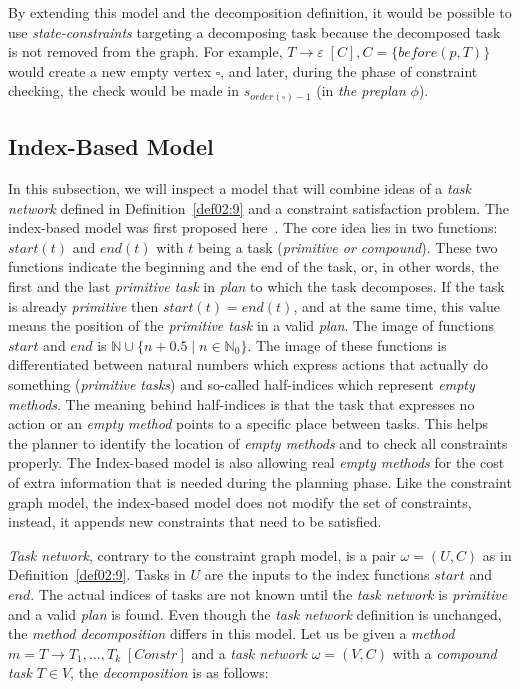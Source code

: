 \medskip\noindent
By extending this model and the decomposition definition, it would be possible to use \emph{state-constraints} targeting a decomposing task because the decomposed task is not removed from the graph. For example, $T \rightarrow \varepsilon \; [C], C = \{before(p, T)\}$ would create a new empty vertex $\square$, and later, during the phase of constraint checking, the check would be made in $s_{order(\square) - 1}$ (in \emph{the preplan} $\phi$).

\subsection{Index-Based Model}

\medskip\noindent
In this subsection, we will inspect a model that will combine ideas of a \emph{task network} defined in Definition~\ref{def02:9} and a constraint satisfaction problem. The index-based model was first proposed here~\cite{ondrckova2023semantics}. The core idea lies in two functions: $start(t)$ and $end(t)$ with $t$ being a task (\emph{primitive or compound}). These two functions indicate the beginning and the end of the task, or, in other words, the first and the last \emph{primitive task} in \emph{plan} to which the task decomposes. If the task is already \emph{primitive} then $start(t) = end(t)$, and at the same time, this value means the position of the \emph{primitive task} in a valid \emph{plan}. The image of functions $start$ and $end$ is $\mathbb{N} \cup \{n + 0.5 \; | \; n \in \mathbb{N}_0\}$. The image of these functions is differentiated between natural numbers which express actions that actually do something (\emph{primitive tasks}) and so-called half-indices which represent \emph{empty methods}. The meaning behind half-indices is that the task that expresses no action or an \emph{empty method} points to a specific place between tasks. This helps the planner to identify the location of \emph{empty methods} and to check all constraints properly. The Index-based model is also allowing real \emph{empty methods} for the cost of extra information that is needed during the planning phase. Like the constraint graph model, the index-based model does not modify the set of constraints, instead, it appends new constraints that need to be satisfied.

\medskip\noindent
\emph{Task network}, contrary to the constraint graph model, is a pair $\omega = (U, C)$ as in Definition~\ref{def02:9}. Tasks in $U$ are the inputs to the index functions $start$ and $end$. The actual indices of tasks are not known until the \emph{task network} is \emph{primitive} and a valid \emph{plan} is found. Even though the \emph{task network} definition is unchanged, the \emph{method decomposition} differs in this model. Let us be given a \emph{method} $m = T \rightarrow T_1, \dots, T_k \; [Constr]$ and a \emph{task network} $\omega = (V, C)$ with a \emph{compound task} $T \in V$, the \emph{decomposition} is as follows:

